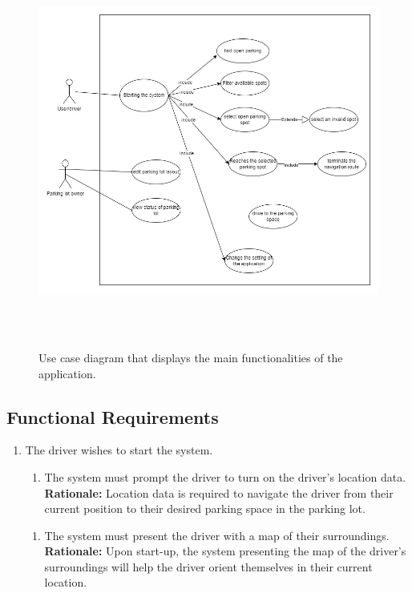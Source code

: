 \documentclass[12pt,letterpaper]{article}
\newcounter{businesseventnum}
\newcounter{funcreqnum}
\begin{document}
\begin{figure}[H]
    \centering
    \includegraphics[width=12cm, height=13cm]{SRS/use_case.jpg}
    \caption{Use case diagram that displays the main functionalities of the application.}
\end{figure}

\subsection{Functional Requirements}
\begin{enumerate}[{BE}\thebusinesseventnum.] 
\item The driver wishes to start the system.
\begin{enumerate}[{FR}\thefuncreqnum.] 
    \item The system must prompt the driver to turn on the driver's location
    data.\\
    \textbf{Rationale:} Location data is required to navigate the driver from
    their current position to their desired parking space in the parking lot.
\end{enumerate}
\begin{enumerate}[{FR}\thefuncreqnum.] 
    \item The system must present the driver with a map of their surroundings.\\
    \textbf{Rationale:} Upon start-up, the system presenting the map of the
    driver's surroundings will help the driver orient themselves in their
    current location.
\end{enumerate}
\end{enumerate}
\end{document}
